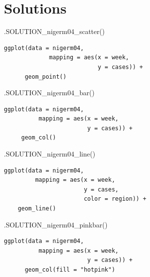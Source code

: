 \documentclass[
  letterpaper,
  DIV=11,
  numbers=noendperiod]{scrreprt}
\newenvironment{Shaded}{\begin{snugshade}}{\end{snugshade}}
\newcommand{\FunctionTok}[1]{\textcolor[rgb]{0.28,0.35,0.67}{#1}}
\newcommand{\NormalTok}[1]{\textcolor[rgb]{0.00,0.23,0.31}{#1}}
\begin{document}
\hypertarget{solutions-9}{%
\section{Solutions}\label{solutions-9}}

\begin{Shaded}
\begin{Highlighting}[]
\FunctionTok{.SOLUTION\_nigerm04\_scatter}\NormalTok{()}
\end{Highlighting}
\end{Shaded}

\begin{verbatim}
ggplot(data = nigerm04,
             mapping = aes(x = week, 
                           y = cases)) +
      geom_point()
\end{verbatim}

\begin{Shaded}
\begin{Highlighting}[]
\FunctionTok{.SOLUTION\_nigerm04\_bar}\NormalTok{()}
\end{Highlighting}
\end{Shaded}

\begin{verbatim}
ggplot(data = nigerm04, 
          mapping = aes(x = week, 
                        y = cases)) + 
     geom_col()
\end{verbatim}

\begin{Shaded}
\begin{Highlighting}[]
\FunctionTok{.SOLUTION\_nigerm04\_line}\NormalTok{()}
\end{Highlighting}
\end{Shaded}

\begin{verbatim}
ggplot(data = nigerm04,
         mapping = aes(x = week,
                       y = cases,
                       color = region)) + 
    geom_line()
\end{verbatim}

\begin{Shaded}
\begin{Highlighting}[]
\FunctionTok{.SOLUTION\_nigerm04\_pinkbar}\NormalTok{()}
\end{Highlighting}
\end{Shaded}

\begin{verbatim}
ggplot(data = nigerm04, 
          mapping = aes(x = week, 
                        y = cases)) +
      geom_col(fill = "hotpink")
\end{verbatim}
\end{document}
